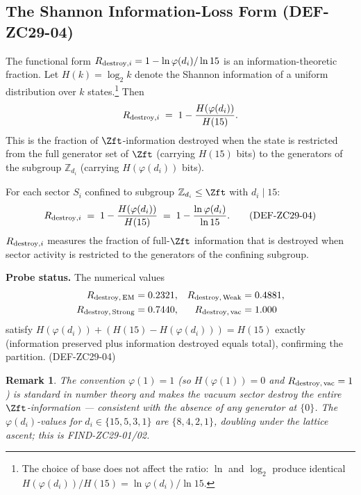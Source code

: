\documentclass[12pt, a4paper]{article}
\newtheorem{remark}{Remark}[section]
\begin{document}
\subsection{The Shannon Information-Loss Form (DEF-ZC29-04)}
\label{sec:def-zc29-04}

The functional form
\(
  R_{{\rm destroy},i} = 1 - \ln \varphi(d_i)/\ln 15
\)
is an information-theoretic fraction. Let $H(k) = \log_2 k$
denote the Shannon information of a uniform distribution over
$k$ states.\footnote{The choice of base does not affect the
ratio: $\ln$ and $\log_2$ produce identical
$H(\varphi(d_i))/H(15) = \ln \varphi(d_i)/\ln 15$.}
Then
\[
  R_{{\rm destroy},i}
    \;=\; 1 - \frac{H(\varphi(d_i))}{H(15)}.
\]
This is the fraction of $\Zft$-information destroyed when the
state is restricted from the full generator set of $\Zft$
(carrying $H(15)$ bits) to the generators of the subgroup
$\mathbb{Z}_{d_i}$ (carrying $H(\varphi(d_i))$ bits).

\begin{formalbox}[title={DEF-ZC29-04: Shannon information loss
  fraction}]
For each sector $S_i$ confined to subgroup
$\mathbb{Z}_{d_i} \leq \Zft$ with $d_i \mid 15$:
\begin{equation}
  R_{{\rm destroy},i}
    \;=\; 1 - \frac{H(\varphi(d_i))}{H(15)}
    \;=\; 1 - \frac{\ln \varphi(d_i)}{\ln 15}.
  \tag{DEF-ZC29-04}\label{eq:def-zc29-04}
\end{equation}
$R_{{\rm destroy},i}$ measures the fraction of full-$\Zft$
information that is destroyed when sector activity is
restricted to the generators of the confining subgroup.

\textbf{Probe status.} The numerical values
\begin{align*}
  R_{{\rm destroy},\,\rm EM} &= 0.2321, &
  R_{{\rm destroy},\,\rm Weak} &= 0.4881,\\
  R_{{\rm destroy},\,\rm Strong} &= 0.7440, &
  R_{{\rm destroy},\,\rm vac} &= 1.000
\end{align*}
satisfy $H(\varphi(d_i)) + (H(15) - H(\varphi(d_i))) = H(15)$
exactly (information preserved plus information destroyed equals
total), confirming the partition.
\hfill\textup{(DEF-ZC29-04)}
\end{formalbox}

\begin{remark}
The convention $\varphi(1) = 1$ (so $H(\varphi(1)) = 0$ and
$R_{{\rm destroy},\,\rm vac} = 1$) is standard in number
theory and makes the vacuum sector destroy the entire
$\Zft$-information --- consistent with the absence of any
generator at $\{0\}$. The $\varphi(d_i)$-values for
$d_i \in \{15, 5, 3, 1\}$ are $\{8, 4, 2, 1\}$, doubling
under the lattice ascent; this is FIND-ZC29-01/02.
\end{remark}
\end{document}
